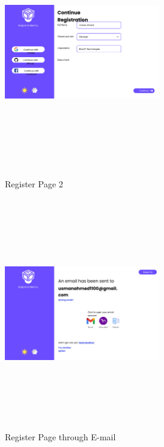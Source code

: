 \begin{figure}[H]
\includegraphics[height=10cm, width=0.6\textwidth]{./images/prototype/0015}
\centering 
\caption{Register Page 2}
\label{fig:prototype1}

\includegraphics[height=10cm, width=0.6\textwidth]{./images/prototype/0007}
\centering 
\caption{Register Page through E-mail}
\label{fig:prototype1}
\end{figure}


